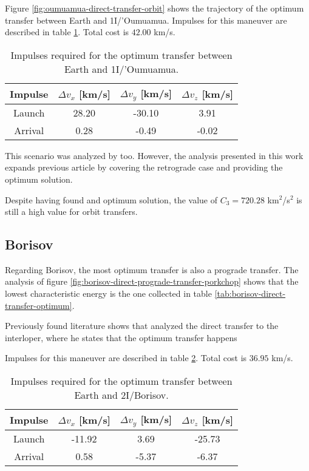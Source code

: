 Figure \ref{fig:oumuamua-direct-transfer-orbit} shows the trajectory of the
optimum transfer between Earth and 1I/'Oumuamua. Impulses for this maneuver are
described in table \ref{tab:oumuamua-direct-transfer-impulses}. Total cost is
$42.00$ km/s.

\begin{table}[H]
  \centering
  \begin{tabular}{|c|c|c|c|}
    \hline
    Impulse & $\Delta v_x$ [km/s] & $\Delta v_y$ [km/s] & $\Delta v_z$ [km/s] \\
    \hline
    Launch & 28.20 & -30.10 & 3.91 \\
    \hline
    Arrival & 0.28 & -0.49 & -0.02 \\
    \hline
  \end{tabular}
  \caption{Impulses required for the optimum transfer between Earth and 1I/'Oumuamua.}
  \label{tab:oumuamua-direct-transfer-impulses}
\end{table}

This scenario was analyzed by \cite{hein2018} too. However, the analysis
presented in this work expands previous article by covering the retrograde case
and providing the optimum solution.

Despite having found and optimum solution, the value of $C_3 = 720.28$
km$^2$/s$^2$ is still a high value for orbit transfers.

\subsection{Borisov}

Regarding Borisov, the most optimum transfer is also a prograde transfer. The
analysis of figure \ref{fig:borisov-direct-prograde-transfer-porkchop} shows
that the lowest characteristic energy is the one collected in table
\ref{tab:borisov-direct-transfer-optimum}.

Previously found literature shows that \cite{hibberd2021} analyzed the direct
transfer to the interloper, where he states that the optimum transfer happens 

Impulses for this maneuver are described in table
\ref{tab:borisov-direct-transfer-impulses}. Total cost is $36.95$ km/s.

\begin{table}[H]
  \centering
  \begin{tabular}{|c|c|c|c|}
    \hline
    Impulse & $\Delta v_x$ [km/s] & $\Delta v_y$ [km/s] & $\Delta v_z$ [km/s] \\
    \hline
    Launch & -11.92 & 3.69 & -25.73 \\
    \hline
    Arrival & 0.58 & -5.37 & -6.37 \\
    \hline
  \end{tabular}
  \caption{Impulses required for the optimum transfer between Earth and 2I/Borisov.}
  \label{tab:borisov-direct-transfer-impulses}
\end{table}


